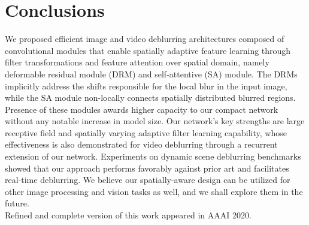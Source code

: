 \documentclass[10pt,twocolumn,letterpaper]{article}
\begin{document}
\begin{table}[t]
\centering
\caption{Quantitative comparisons of different versions of our single image deblurring network on GoPro testset~\cite{nah2017deep}.
\label{TableAblationSingle}} 
	\vspace{-1.0em}
\end{table}










\vspace{-0.4cm}
\section{Conclusions}
	\vspace{-0.7em}

We proposed efficient image and video deblurring architectures composed of convolutional modules that enable spatially adaptive feature learning through filter transformations and feature attention over spatial domain, namely deformable residual module (DRM) and self-attentive (SA) module. The DRMs implicitly address the shifts responsible for the local blur in the input image, while the SA module non-locally connects spatially distributed blurred regions. Presence of these modules awards higher capacity to our compact network without any notable increase in model size. Our network's key strengths are large receptive field and spatially varying adaptive filter learning capability, whose effectiveness is also demonstrated for video deblurring through a recurrent extension of our network. Experiments on dynamic scene deblurring benchmarks showed that our approach performs favorably against prior art and facilitates real-time deblurring. We believe our spatially-aware design can be utilized for other image processing and vision tasks as well, and we shall explore them in the future.\\

Refined and complete version of this work appeared in AAAI 2020.


{\small


}
\end{document}
